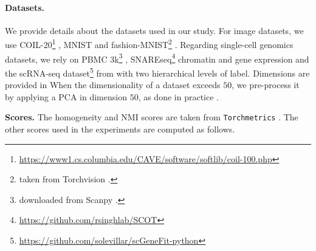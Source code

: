 \paragraph{Datasets.}
We provide details about the datasets used in our study. 
For image datasets, we use COIL-20\footnote{\url{https://www1.cs.columbia.edu/CAVE/software/softlib/coil-100.php}} \cite{nene1996columbia}, MNIST and fashion-MNIST\footnote{taken from Torchvision \cite{marcel2010torchvision}.} \cite{xiao2017fashion}. Regarding single-cell genomics datasets, we rely on PBMC 3k\footnote{downloaded from Scanpy \cite{wolf2018scanpy}.} \cite{wolf2018scanpy}, SNAREseq\footnote{\url{https://github.com/rsinghlab/SCOT}} chromatin and gene expression \cite{chen2019high} and the scRNA-seq dataset\footnote{\url{https://github.com/solevillar/scGeneFit-python}} from \cite{zeisel2015cell} with two hierarchical levels of label. 
Dimensions are provided in 
When the dimensionality of a dataset exceeds $50$, we pre-process it by applying a PCA in dimension $50$, as done in practice \cite{van2008visualizing}.

\begin{table}[h!] \vspace{-5mm}
\centering
\caption{Dataset Sizes.}\label{tab:dataset_details}
\end{table}

\textbf{Scores.} The homogeneity and NMI scores are taken from \texttt{Torchmetrics} \cite{detlefsen2022torchmetrics}. The other scores used in the experiments are computed as follows.

